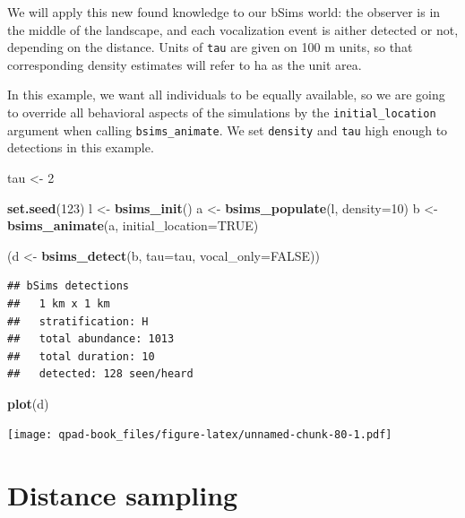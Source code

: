 \documentclass[12pt,]{book}
\newenvironment{Shaded}{\begin{snugshade}}{\end{snugshade}}
\newcommand{\DataTypeTok}[1]{\textcolor[rgb]{0.13,0.29,0.53}{#1}}
\newcommand{\DecValTok}[1]{\textcolor[rgb]{0.00,0.00,0.81}{#1}}
\newcommand{\KeywordTok}[1]{\textcolor[rgb]{0.13,0.29,0.53}{\textbf{#1}}}
\newcommand{\NormalTok}[1]{#1}
\newcommand{\OtherTok}[1]{\textcolor[rgb]{0.56,0.35,0.01}{#1}}
\newcommand{\StringTok}[1]{\textcolor[rgb]{0.31,0.60,0.02}{#1}}
\begin{document}
We will apply this new found knowledge to our bSims world:
the observer is in the middle of the landscape, and each vocalization
event is aither detected or not, depending on the distance.
Units of \texttt{tau} are given on 100 m units, so that corresponding
density estimates will refer to ha as the unit area.

In this example, we want all individuals to be equally available,
so we are going to override all behavioral aspects of the simulations
by the \texttt{initial\_location} argument when calling \texttt{bsims\_animate}.
We set \texttt{density} and \texttt{tau} high enough to detections in this example.

\begin{Shaded}
\begin{Highlighting}[]
\NormalTok{tau <-}\StringTok{ }\DecValTok{2}

\KeywordTok{set.seed}\NormalTok{(}\DecValTok{123}\NormalTok{)}
\NormalTok{l <-}\StringTok{ }\KeywordTok{bsims_init}\NormalTok{()}
\NormalTok{a <-}\StringTok{ }\KeywordTok{bsims_populate}\NormalTok{(l, }\DataTypeTok{density=}\DecValTok{10}\NormalTok{)}
\NormalTok{b <-}\StringTok{ }\KeywordTok{bsims_animate}\NormalTok{(a, }\DataTypeTok{initial_location=}\OtherTok{TRUE}\NormalTok{)}

\NormalTok{(d <-}\StringTok{ }\KeywordTok{bsims_detect}\NormalTok{(b, }\DataTypeTok{tau=}\NormalTok{tau, }\DataTypeTok{vocal_only=}\OtherTok{FALSE}\NormalTok{))}
\end{Highlighting}
\end{Shaded}

\begin{verbatim}
## bSims detections
##   1 km x 1 km
##   stratification: H
##   total abundance: 1013
##   total duration: 10
##   detected: 128 seen/heard
\end{verbatim}

\begin{Shaded}
\begin{Highlighting}[]
\KeywordTok{plot}\NormalTok{(d)}
\end{Highlighting}
\end{Shaded}

\texttt{[image: qpad-book\_files/figure-latex/unnamed-chunk-80-1.pdf]}

\hypertarget{distance-sampling}{%
\section{Distance sampling}\label{distance-sampling}}
\end{document}
